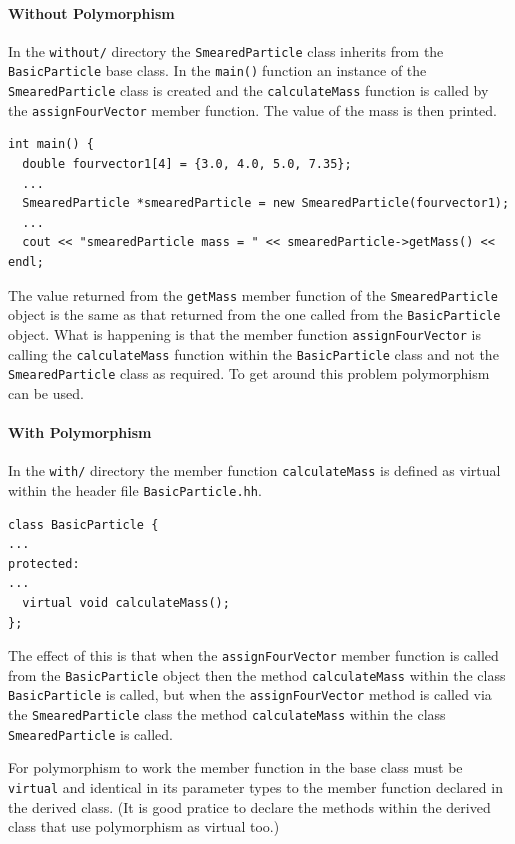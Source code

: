 \documentclass[11pt,a4paper]{scrartcl}
\def\main{\texttt{main()}$\;$}
\begin{document}
\paragraph{Without Polymorphism}
In the \texttt{without/} directory the
\texttt{SmearedParticle} class inherits from the
\texttt{BasicParticle} base class.  In the \main function an instance
of the \texttt{SmearedParticle} class is created and the
\texttt{calculateMass} function is called by the
\texttt{assignFourVector} member function.  The value of the mass is
then printed.
%
\begin{verbatim}
int main() {
  double fourvector1[4] = {3.0, 4.0, 5.0, 7.35};
  ...
  SmearedParticle *smearedParticle = new SmearedParticle(fourvector1);
  ...
  cout << "smearedParticle mass = " << smearedParticle->getMass() <<  endl;
\end{verbatim}
%
The value returned from the \texttt{getMass} member function of the
\texttt{SmearedParticle} object is the same as that returned from the
one called from the \texttt{BasicParticle} object.  What is happening
is that the member function \texttt{assignFourVector} is calling the
\texttt{calculateMass} function within the \texttt{BasicParticle}
class and not the \texttt{SmearedParticle} class as required.  To get
around this problem polymorphism can be used.  

\paragraph{With Polymorphism}
In the \texttt{with/} directory the member function \texttt{calculateMass} is
defined as virtual within the header file \texttt{BasicParticle.hh}.
%
\begin{verbatim}
class BasicParticle {
...
protected:
...
  virtual void calculateMass();
};
\end{verbatim}
%
The effect of this is that when the \texttt{assignFourVector} member
function is called from the \texttt{BasicParticle} object then the
method \texttt{calculateMass} within the class \texttt{BasicParticle}
is called, but when the \texttt{assignFourVector} method is called via
the \texttt{SmearedParticle} class the method \texttt{calculateMass}
within the class \texttt{SmearedParticle} is called.

For polymorphism to work the member function in the base class must be
\texttt{virtual} and identical in its parameter types to the member
function declared in the derived class.  (It is good pratice to
declare the methods within the derived class that use polymorphism as
virtual too.)
\end{document}
